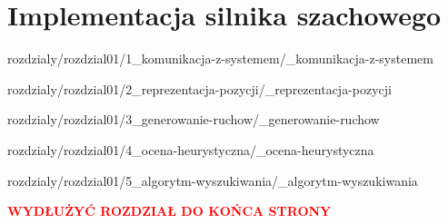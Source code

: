 \chapter {Implementacja silnika szachowego}
\label {ch: implementacja-silnika-szachowego}

 {rozdzialy/rozdzial01/1_komunikacja-z-systemem/_komunikacja-z-systemem}

 {rozdzialy/rozdzial01/2_reprezentacja-pozycji/_reprezentacja-pozycji}

 {rozdzialy/rozdzial01/3_generowanie-ruchow/_generowanie-ruchow}

 {rozdzialy/rozdzial01/4_ocena-heurystyczna/_ocena-heurystyczna}

 {rozdzialy/rozdzial01/5_algorytm-wyszukiwania/_algorytm-wyszukiwania}

\begin{center}
    \textcolor{red}{\textbf{WYDŁUŻYĆ ROZDZIAŁ DO KOŃCA STRONY}}
\end{center}



